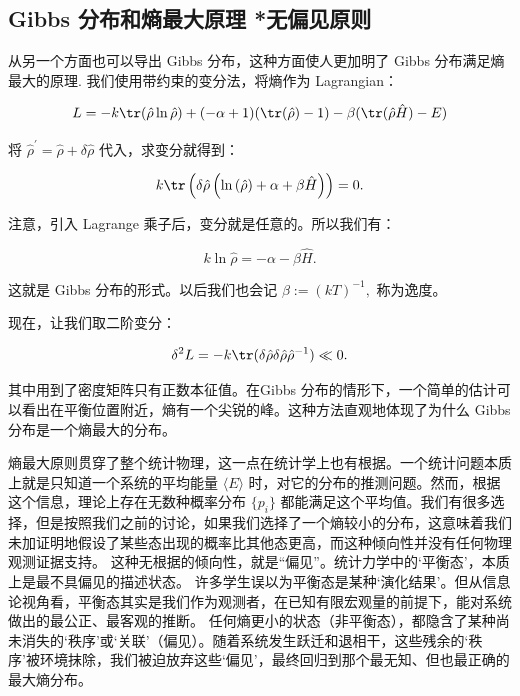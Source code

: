 \subsection{Gibbs 分布和熵最大原理 *无偏见原则}
从另一个方面也可以导出 Gibbs 分布，这种方面使人更加明了 Gibbs 分布满足熵最大的原理. 我们使用带约束的变分法，将熵作为 Lagrangian：
\begin{linenomath}\begin{equation}
L = -k\tr(\hat{\rho}\ln\hat{\rho}) + (-\alpha + 1) (\tr(\hat{\rho}) - 1) - \beta (\tr(\hat{\rho} \hat H) - E)
\end{equation}\end{linenomath}
将 $\hat{\rho}^\prime = \hat{\rho} + \delta\hat{\rho}$ 代入，求变分就得到：
\begin{linenomath}\begin{equation}
k\tr\left( \delta\hat{\rho}\left( \ln\left( \hat{\rho}  \right) + \alpha + \beta \hat{H} \right) \right) = 0.
\end{equation}\end{linenomath}
注意，引入 Lagrange 乘子后，变分就是任意的。所以我们有：
\begin{linenomath}\begin{equation}
k\ln\hat{\rho} = -\alpha - \beta \hat{H}.
\end{equation}\end{linenomath}
这就是 Gibbs 分布的形式。以后我们也会记 $\beta := (kT)^{-1},$ 称为逸度。

现在，让我们取二阶变分：
\begin{linenomath}\begin{equation}
\delta^2 L = -k\tr (\delta\hat \rho \delta\hat \rho \hat{\rho}^{-1}) \ll 0.
\end{equation}\end{linenomath}
其中用到了密度矩阵只有正数本征值。在Gibbs 分布的情形下，一个简单的估计可以看出在平衡位置附近，熵有一个尖锐的峰。这种方法直观地体现了为什么 Gibbs 分布是一个熵最大的分布。

熵最大原则贯穿了整个统计物理，这一点在统计学上也有根据。一个统计问题本质上就是只知道一个系统的平均能量 $\langle E \rangle$ 时，对它的分布的推测问题。然而，根据这个信息，理论上存在无数种概率分布 $\{p_i\}$ 都能满足这个平均值。我们有很多选择，但是按照我们之前的讨论，如果我们选择了一个熵较小的分布，这意味着我们未加证明地假设了某些态出现的概率比其他态更高，而这种倾向性并没有任何物理观测证据支持。 这种无根据的倾向性，就是“偏见”。统计力学中的‘平衡态’，本质上是最不具偏见的描述状态。
许多学生误以为平衡态是某种‘演化结果’。但从信息论视角看，平衡态其实是我们作为观测者，在已知有限宏观量的前提下，能对系统做出的最公正、最客观的推断。
任何熵更小的状态（非平衡态），都隐含了某种尚未消失的‘秩序’或‘关联’（偏见）。随着系统发生跃迁和退相干，这些残余的‘秩序’被环境抹除，我们被迫放弃这些‘偏见’，最终回归到那个最无知、但也最正确的最大熵分布。

